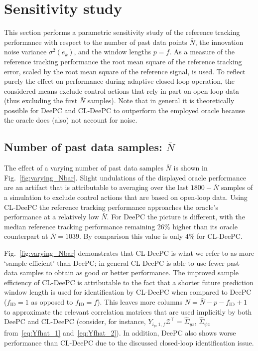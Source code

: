 \section{Sensitivity study}
This section performs a parametric sensitivity study of the reference tracking performance with respect to the number of past data points $\bar{N}$, the innovation noise variance $\sigma^2(e_k)$, and the window lengths $p=f$. As a measure of the reference tracking performance the root mean square of the reference tracking error, scaled by the root mean square of the reference signal, is used. To reflect purely the effect on performance during adaptive closed-loop operation, the considered means exclude control actions that rely in part on open-loop data (thus excluding the first $\bar{N}$ samples). Note that in general it is theoretically possible for \ac{DeePC} and \ac{CL-DeePC} to outperform the employed oracle because the oracle does (also) not account for noise.

\subsection{Number of past data samples: $\bar{N}$}
The effect of a varying number of past data samples $\bar{N}$ is shown in Fig.~\ref{fig:varying_Nbar}. Slight undulations of the displayed oracle performance are an artifact that is attributable to averaging over the last $1800-\bar{N}$ samples of a simulation to exclude control actions that are based on open-loop data. Using \ac{CL-DeePC} the reference tracking performance approaches the oracle's performance at a relatively low $\bar{N}$. For \ac{DeePC} the picture is different, with the median reference tracking performance remaining $26\%$ higher than its oracle counterpart at $\bar{N}=1039$. By comparison this value is only $4\%$ for \ac{CL-DeePC}.

Fig.~\ref{fig:varying_Nbar} demonstrates that \ac{CL-DeePC} is what we refer to as more `sample efficient' than \ac{DeePC}; in general \ac{CL-DeePC} is able to use fewer past data samples to obtain as good or better performance. The improved sample efficiency of \ac{CL-DeePC} is attributable to the fact that a shorter future prediction window length is used for identification by \ac{CL-DeePC} when compared to \ac{DeePC} ($f_\mathrm{ID}=1$ as opposed to $f_\mathrm{ID}=f$). This leaves more columns $N=\bar{N}-p-f_\mathrm{ID}+1$ to approximate the relevant correlation matrices that are used implicitly by both \ac{DeePC} and \ac{CL-DeePC} (consider, for instance, $Y_{i_p,1,f}\mathcal{Z}^\top=\hat{\Sigma}_{yz}$, $\hat{\Sigma}_{\psi z}$ from~\eqref{eq:Yfhat_1} and~\eqref{eq:Yfhat_2}). In addition, \ac{DeePC} also shows worse performance than \ac{CL-DeePC} due to the discussed closed-loop identification issue.

